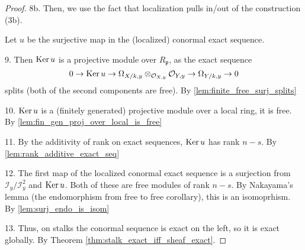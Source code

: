 \begin{corollary}
\begin{proof}
  8b. Then, we use the fact that localization pulls in/out of the construction (3b).

  Let $u$ be the surjective map in the (localized) conormal exact sequence.

  9.  Then $\operatorname{Ker} u$ is a projective module over $R_\mathfrak{p}$, as
      the exact sequence
      \[
        0 \to \operatorname{Ker} u \to 
        \Omega_{X/k,y} \otimes_{\mathcal{O}_{X,y}} \mathcal{O}_{Y,y} 
        \to
        \Omega_{Y/k,y} 
        \to 0
      \]
      splits (both of the second components are free).
      By \ref{lem:finite_free_surj_splits}

  10. $\operatorname{Ker} u$ is a (finitely generated) projective module over a local ring, it is free.
      By \ref{lem:fin_gen_proj_over_local_is_free}
      
  11. By the additivity of rank on exact sequences, $\operatorname{Ker} u$ has rank $n-s$.
      By \ref{lem:rank_additive_exact_seq}

  12. The first map of the localized conormal exact sequence is a surjection from
      $\mathcal{I}_y / \mathcal{I}^2_y$ and $\operatorname{Ker} u$. 
      Both of these are free modules of rank $n-s$. 
      By Nakayama's lemma (the endomorphism from free to free corollary),
      this is an isomoprhism.
      By \ref{lem:surj_endo_is_isom}

  13. Thus, on stalks the conormal sequence is exact on the left, so it is 
      exact globally.
      By Theorem \ref{thm:stalk_exact_iff_sheaf_exact}.
\end{proof}


\end{corollary}
